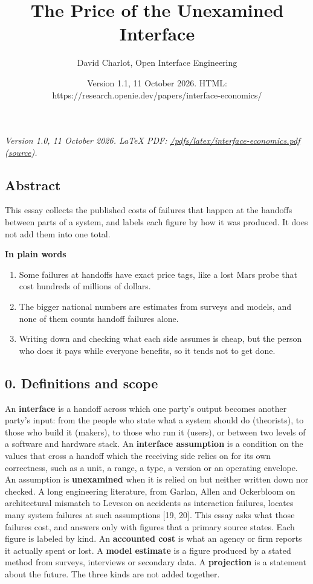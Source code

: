\documentclass[
  10pt,
]{article}
\title{The Price of the Unexamined Interface}
\author{David Charlot, Open Interface Engineering}
\date{Version 1.1, 11 October 2026. HTML:
https://research.openie.dev/papers/interface-economics/}
\providecommand{\tightlist}{%
  \setlength{\itemsep}{0pt}\setlength{\parskip}{0pt}}
\begin{document}
\maketitle

{
\setcounter{tocdepth}{2}
\tableofcontents
}
\emph{Version 1.0, 11 October 2026. LaTeX PDF:
\href{https://research.openie.dev/pdfs/latex/interface-economics.pdf}{/pdfs/latex/interface-economics.pdf}
(\href{https://research.openie.dev/pdfs/latex/interface-economics.tex}{source}).}

\subsection{Abstract}\label{abstract}

This essay collects the published costs of failures that happen at the
handoffs between parts of a system, and labels each figure by how it was
produced. It does not add them into one total.

\textbf{In plain words}

\begin{enumerate}
\def\labelenumi{\arabic{enumi}.}
\tightlist
\item
  Some failures at handoffs have exact price tags, like a lost Mars
  probe that cost hundreds of millions of dollars.
\item
  The bigger national numbers are estimates from surveys and models, and
  none of them counts handoff failures alone.
\item
  Writing down and checking what each side assumes is cheap, but the
  person who does it pays while everyone benefits, so it tends not to
  get done.
\end{enumerate}

\subsection{0. Definitions and scope}\label{definitions-and-scope}

An \textbf{interface} is a handoff across which one party's output
becomes another party's input: from the people who state what a system
should do (theorists), to those who build it (makers), to those who run
it (users), or between two levels of a software and hardware stack. An
\textbf{interface assumption} is a condition on the values that cross a
handoff which the receiving side relies on for its own correctness, such
as a unit, a range, a type, a version or an operating envelope. An
assumption is \textbf{unexamined} when it is relied on but neither
written down nor checked. A long engineering literature, from Garlan,
Allen and Ockerbloom on architectural mismatch to Leveson on accidents
as interaction failures, locates many system failures at such
assumptions {[}19, 20{]}. This essay asks what those failures cost, and
answers only with figures that a primary source states. Each figure is
labeled by kind. An \textbf{accounted cost} is what an agency or firm
reports it actually spent or lost. A \textbf{model estimate} is a figure
produced by a stated method from surveys, interviews or secondary data.
A \textbf{projection} is a statement about the future. The three kinds
are not added together.
\end{document}

